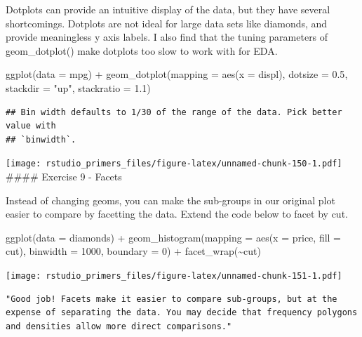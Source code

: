 \documentclass[
]{article}
\newenvironment{Shaded}{\begin{snugshade}}{\end{snugshade}}
\newcommand{\AttributeTok}[1]{\textcolor[rgb]{0.77,0.63,0.00}{#1}}
\newcommand{\DecValTok}[1]{\textcolor[rgb]{0.00,0.00,0.81}{#1}}
\newcommand{\FloatTok}[1]{\textcolor[rgb]{0.00,0.00,0.81}{#1}}
\newcommand{\FunctionTok}[1]{\textcolor[rgb]{0.00,0.00,0.00}{#1}}
\newcommand{\NormalTok}[1]{#1}
\newcommand{\SpecialCharTok}[1]{\textcolor[rgb]{0.00,0.00,0.00}{#1}}
\newcommand{\StringTok}[1]{\textcolor[rgb]{0.31,0.60,0.02}{#1}}
\begin{document}
Dotplots can provide an intuitive display of the data, but they have
several shortcomings. Dotplots are not ideal for large data sets like
diamonds, and provide meaningless y axis labels. I also find that the
tuning parameters of geom\_dotplot() make dotplots too slow to work with
for EDA.

\begin{Shaded}
\begin{Highlighting}[]
\FunctionTok{ggplot}\NormalTok{(}\AttributeTok{data =}\NormalTok{ mpg) }\SpecialCharTok{+}
  \FunctionTok{geom\_dotplot}\NormalTok{(}\AttributeTok{mapping =} \FunctionTok{aes}\NormalTok{(}\AttributeTok{x =}\NormalTok{ displ), }\AttributeTok{dotsize =} \FloatTok{0.5}\NormalTok{, }\AttributeTok{stackdir =} \StringTok{"up"}\NormalTok{, }\AttributeTok{stackratio =} \FloatTok{1.1}\NormalTok{)}
\end{Highlighting}
\end{Shaded}

\begin{verbatim}
## Bin width defaults to 1/30 of the range of the data. Pick better value with
## `binwidth`.
\end{verbatim}

\texttt{[image: rstudio\_primers\_files/figure-latex/unnamed-chunk-150-1.pdf]}
\#\#\#\# Exercise 9 - Facets

Instead of changing geoms, you can make the sub-groups in our original
plot easier to compare by facetting the data. Extend the code below to
facet by cut.

\begin{Shaded}
\begin{Highlighting}[]
\FunctionTok{ggplot}\NormalTok{(}\AttributeTok{data =}\NormalTok{ diamonds) }\SpecialCharTok{+}
  \FunctionTok{geom\_histogram}\NormalTok{(}\AttributeTok{mapping =} \FunctionTok{aes}\NormalTok{(}\AttributeTok{x =}\NormalTok{ price, }\AttributeTok{fill =}\NormalTok{ cut), }\AttributeTok{binwidth =} \DecValTok{1000}\NormalTok{, }\AttributeTok{boundary =} \DecValTok{0}\NormalTok{) }\SpecialCharTok{+} 
  \FunctionTok{facet\_wrap}\NormalTok{(}\SpecialCharTok{\textasciitilde{}}\NormalTok{cut)}
\end{Highlighting}
\end{Shaded}

\texttt{[image: rstudio\_primers\_files/figure-latex/unnamed-chunk-151-1.pdf]}

\begin{verbatim}
"Good job! Facets make it easier to compare sub-groups, but at the expense of separating the data. You may decide that frequency polygons and densities allow more direct comparisons."
\end{verbatim}
\end{document}
